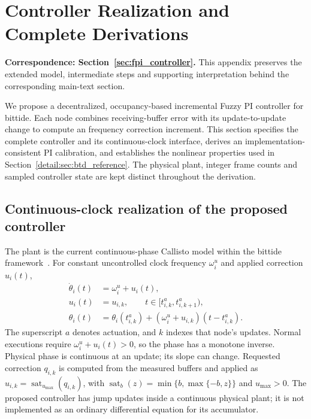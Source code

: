 \section{Controller Realization and Complete Derivations}
\label{app:controller}
\noindent\textbf{Correspondence: Section~\ref{sec:fpi_controller}.} This appendix preserves the extended model, intermediate steps and supporting interpretation behind the corresponding main-text section.


\label{detail:sec:fpi_controller}
We propose a decentralized, occupancy-based incremental Fuzzy PI controller
for bittide. Each node combines receiving-buffer error with its
update-to-update change to compute an frequency correction increment.
This section specifies the complete controller and its continuous-clock
interface, derives an implementation-consistent PI calibration, and
establishes the nonlinear properties used in
Section~\ref{detail:sec:btd_reference}. The physical plant, integer frame counts
and sampled controller state are kept distinct throughout the derivation.

\subsection{Continuous-clock realization of the proposed controller}

\label{detail:subsec:fpi_laws}
The plant is the current continuous-phase Callisto model within the bittide
framework~\cite{lall2024logicalSynchrony}. For constant
uncontrolled clock frequency $\omega_i^u$ and applied correction $u_i(t)$,
\begin{align}
 \dot\theta_i(t)&=\omega_i^u+u_i(t),\nonumber\\
 u_i(t)&=u_{i,k},\qquad t\in[t^a_{i,k},t^a_{i,k+1}),\nonumber\\
 \theta_i(t)&=\theta_i(t^a_{i,k})+
       (\omega_i^u+u_{i,k})(t-t^a_{i,k}).
 \label{detail:eq:fpi_continuous_plant}
\end{align}
The superscript $a$ denotes actuation, and $k$ indexes that node's updates.
Normal executions require $\omega_i^u+u_i(t)>0$, so the phase has a
monotone inverse. Physical phase is continuous at an update; its slope can change. Requested
correction $q_{i,k}$ is computed from the measured buffers and applied as
$u_{i,k}=\operatorname{sat}_{u_{\max}}(q_{i,k})$, with
$\operatorname{sat}_b(z)=\min\{b,\max\{-b,z\}\}$ and $u_{\max}>0$.
The proposed controller has jump updates inside a continuous physical plant;
it is not implemented as an ordinary differential equation for its accumulator.

